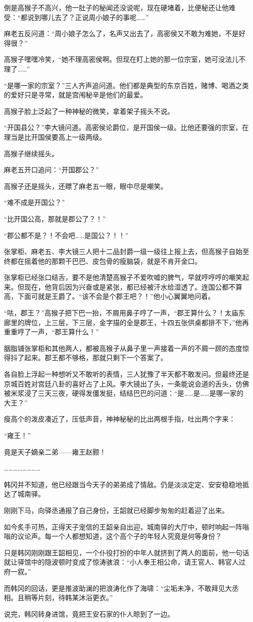 倒是高猴子不高兴，他一肚子的秘闻还没说呢，现在硬堵着，比便秘还让他难受：“都说到哪儿去了？正说周小娘子的事呢……”

麻老五反问道：“周小娘子怎么了，名声又出去了，高密侯又不敢为难她，不是好得很？”

高猴子嘿嘿冷笑，“她不理高密侯啊。但现在盯上她的那一位宗室，她可没法儿不理了……”

“是哪一家的宗室？”三人齐声追问道。他们都是典型的东京百姓，赌博、喝酒之类的爱好只是寻常，就是宫闱秘辛是他们的最爱。

高猴子脸上泛起了一种神秘的微笑，拿着架子摇头不说。

“开国县公？”李大镜问道。高密侯论爵位，是开国侯一级。比他还要强的宗室，在理当是比开国侯要高上一级两级。

高猴子继续摇头。

麻老五开口追问：“开国郡公？”

高猴子还是摇头，还瞟了麻老五一眼，眼中尽是嘲笑。

“难不成是开国公？”

“比开国公高，那就是郡公了？！”

“郡公都不是？！不会吧……是国公？！！”

张掌柜、麻老五、李大镜三人把十二品封爵一级一级往上报上去，但高猴子自始至终都在摇着他的那颗干巴巴、皮包骨的瘦脑袋，就是不肯开金口。

张掌柜已经张口结舌，要不是他清楚高猴子不爱吹嘘的脾气，早就哼哼哼的嘲笑起来。但现在，他背后因为兴奋或是紧张，都已经被汗水给湿透了。连国公都不算高，下面可就是王爵了。“该不会是个郡王吧？！”他小心翼翼地问着。

“呿，郡王？”高猴子把下巴一抬，不屑用鼻子哼了一声，“郡王算什么？！太庙东廊里的牌位，上三层，下三层，金字描的全是郡王，十四五张供桌都排不下，”他再重重哼了一声，“郡王算什么！”

胭脂铺张掌柜和其他两人，都被高猴子从鼻子里一声接着一声的不屑一顾的态度惊得抖了起来。郡王都不够格，那就只剩下一个答案了。

各自脸上浮起一种想听又不敢听的表情，三人犹豫了半天都不敢发问。但最终还是京城百姓对宫廷八卦的喜好占了上风。李大镜出了头，一条能说会道的舌头，仿佛被米浆浸了三天三夜，硬得发僵发挺，结结巴巴的问道：“是……是……是哪一家的大王？”

瘦高个的泼皮凑近了，压低声音，神神秘秘的比出两根手指，吐出两个字来：

“雍王！”

竟是天子嫡亲二弟——雍王赵颢！

……………………

韩冈并不知道，他已经跟当今天子的弟弟成了情敌。仍是淡淡定定、安安稳稳地抵达了城南驿。

刚刚下马，向驿丞通报了自己身份，王韶就已经脚步匆匆的赶着迎了出来。

如今炙手可热，正得天子宠信的王韶亲自出迎，城南驿的大厅中，顿时响起一阵嗡嗡的议论声。每一个人都想知道，这个高个子的年轻人究竟是何等身份？

只是韩冈刚刚跟王韶相见，一个仆役打扮的中年人就挤到了两人的面前，他一句话就让驿馆中的隐波顿时变成了惊涛骇浪：“小人奉王相公命，请王官人、韩官人过府一叙。”

而韩冈的回话，更是推波助澜的把浪涛化作了海啸：“尘垢未净，不敢拜见大丞相。且稍等片刻，待韩某沐浴更衣。”

说完，韩冈转身进馆，竟把王安石家的仆人晾到了一边。

